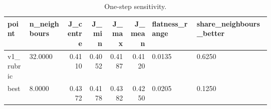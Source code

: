\begin{table}[htbp]
\centering\tiny
\caption{One-step sensitivity.}
\label{tab:sensitivity}
\setlength{\tabcolsep}{3pt}
\begin{tabular}{lp{0.149\linewidth}rrrrp{0.174\linewidth}p{0.285\linewidth}}
\toprule
point & n\_\allowbreak{}neighbours & J\_\allowbreak{}centre & J\_\allowbreak{}min & J\_\allowbreak{}max & J\_\allowbreak{}mean & flatness\_\allowbreak{}range & share\_\allowbreak{}neighbours\_\allowbreak{}better \\
\midrule
v1\_\allowbreak{}rubric & 32.0000 & 0.4110 & 0.4052 & 0.4187 & 0.4120 & 0.0135 & 0.6250 \\
best & 8.0000 & 0.4372 & 0.4178 & 0.4382 & 0.4250 & 0.0205 & 0.1250 \\
\bottomrule
\end{tabular}
\end{table}
